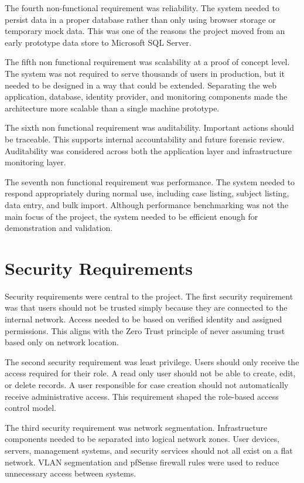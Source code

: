 The fourth non-functional requirement was reliability. The system needed to persist data in a proper database rather than only using browser storage or temporary mock data. This was one of the reasons the project moved from an early prototype data store to Microsoft SQL Server.

The fifth non functional requirement was scalability at a proof of concept level. The system was not required to serve thousands of users in production, but it needed to be designed in a way that could be extended. Separating the web application, database, identity provider, and monitoring components made the architecture more scalable than a single machine prototype.

The sixth non functional requirement was auditability. Important actions should be traceable. This supports internal accountability and future forensic review. Auditability was considered across both the application layer and infrastructure monitoring layer.

The seventh non functional requirement was performance. The system needed to respond appropriately during normal use, including case listing, subject listing, data entry, and bulk import. Although performance benchmarking was not the main focus of the project, the system needed to be efficient enough for demonstration and validation.


\section{Security Requirements}

Security requirements were central to the project. The first security requirement was that users should not be trusted simply because they are connected to the internal network. Access needed to be based on verified identity and assigned permissions. This aligns with the Zero Trust principle of never assuming trust based only on network location.

The second security requirement was least privilege. Users should only receive the access required for their role. A read only user should not be able to create, edit, or delete records. A user responsible for case creation should not automatically receive administrative access. This requirement shaped the role-based access control model.

The third security requirement was network segmentation. Infrastructure components needed to be separated into logical network zones. User devices, servers, management systems, and security services should not all exist on a flat network. VLAN segmentation and pfSense firewall rules were used to reduce unnecessary access between systems.

